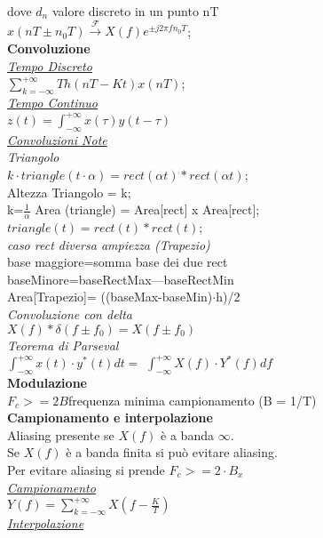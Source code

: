 \documentclass[a4paper]{article}
\begin{document}
\begin{multicols*}{2}
dove $d_n$ valore discreto in un punto nT \\
$x(nT{\pm}n_0T) \xrightarrow{\mathscr{F}} X(f)e^{{\pm}j2{\pi}f{n_0T}}$; \\
\textbf{Convoluzione} \\
\underline{\textit{Tempo Discreto}} \\
$\sum_{k=-\infty}^{+\infty}{Th(nT-Kt)x(nT)}$; \\
\underline{\textit{Tempo Continuo}} \\
$z (t)=\int_{-\infty}^{+\infty}{x(\tau)y(t-\tau)}$\\
\underline{\textit{Convoluzioni Note}} \\
\textit{Triangolo }\\
$k\cdot triangle(t\cdot \alpha) = rect(\alpha t) * rect(\alpha t)$; \\
Altezza Triangolo = k; \\
k=$\frac{1}{\alpha}$
Area (triangle) = Area[rect] x Area[rect]; \\ 
$triangle(t) = rect(t) * rect(t)$; \\
\textit{caso rect diversa ampiezza (Trapezio)} \\
base maggiore=somma base dei due rect\\
baseMinore=baseRectMax---baseRectMin\\
Area[Trapezio]= ((baseMax-baseMin)$\cdot$h)/2\\
\textit{Convoluzione con delta} \\
$X(f)*\delta(f \pm f_0)=X(f\pm f_0)$ \\ 
\textit{Teorema di Parseval }\\
$\int_{-\infty}^{+\infty}{x(t)\cdot y^*(t)dt = }$ 
$\int_{-\infty}^{+\infty}{X(f)\cdot Y^*(f)df}$ \\
\textbf{Modulazione} \\
$F_c>=2B$frequenza minima campionamento (B = 1/T)\\
\textbf{Campionamento e interpolazione} \\
Aliasing presente se $X(f)$ è a banda $\infty$. \\
Se $X(f)$ è a banda finita si può evitare aliasing.\\
Per evitare aliasing si prende $F_c >= 2\cdot B_x$ \\
\underline{\textit{Campionamento}}\\
$Y(f)=\sum_{k=-\infty}^{+\infty}{X(f-\frac{K}{T})}$ \\
\underline{\textit{Interpolazione}}\\

\end{multicols*}
\end{document}
